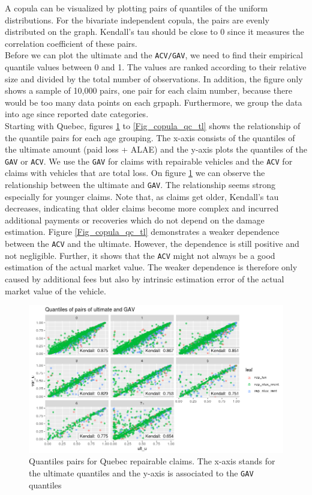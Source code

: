 	A copula can be visualized by plotting pairs of quantiles of the uniform distributions. For the bivariate independent copula, the pairs are evenly distributed on the graph. Kendall’s tau should be close to 0 since it measures the correlation coefficient of these pairs. \\
	Before we can plot the ultimate and the \texttt{ACV/GAV}, we need to find their empirical quantile values between 0 and 1. The values are ranked according to their relative size and divided by the total number of observations. In addition, the figure only shows a sample of 10,000 pairs, one pair for each claim number, because there would be too many data points on each grpaph. Furthermore, we group the data into age since reported date categories. \\
	Starting with Quebec, figures \ref{Fig_copula_qc_rep} to \ref{Fig_copula_qc_tl} shows the relationship of the quantile pairs for each age grouping. The x-axis consists of the quantiles of the ultimate amount (paid loss + ALAE) and the y-axis plots the quantiles of the \texttt{GAV} or \texttt{ACV}. We use the \texttt{GAV} for claims with repairable vehicles and the \texttt{ACV} for claims with vehicles that are total loss. On figure \ref{Fig_copula_qc_rep} we can observe the relationship between the ultimate and \texttt{GAV}. The relationship seems strong especially for younger claims. Note that, as claims  get older, Kendall’s tau decreases, indicating that older claims become more complex and incurred additional payments or recoveries which do not depend on the damage estimation. Figure \ref{Fig_copula_qc_tl} demonstrates a weaker dependence between the \texttt{ACV} and the ultimate. However, the dependence is still positive and not negligible. Further, it shows that the \texttt{ACV} might not always be a good estimation of the actual market value. The weaker dependence is therefore only caused by additional fees but also by intrinsic estimation error of the actual market value of the vehicle. 
	
	\begin{figure}[H]
		\begin{center}
			\includegraphics[scale=0.4]{Graphiques/qc_rep} 
			\renewcommand{\figurename}{Figure}
			\caption[Quebec repairable claims relationship]{Quantiles pairs for Quebec repairable claims. The x-axis stands for the ultimate quantiles and the y-axis is associated to the \texttt{GAV} quantiles}\label{Fig_copula_qc_rep}
		\end{center}
	\end{figure}

